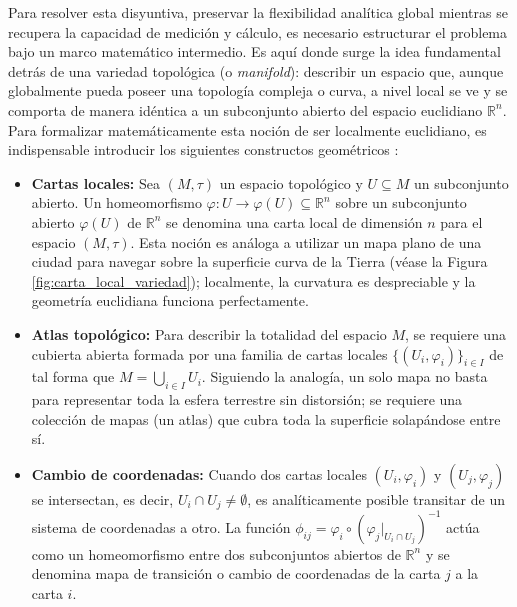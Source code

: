 Para resolver esta disyuntiva, preservar la flexibilidad analítica global mientras se recupera la capacidad de medición 
y cálculo, es necesario estructurar el problema bajo un marco matemático intermedio. Es aquí donde surge la idea 
fundamental detrás de una variedad topológica (o \textit{manifold}): describir un espacio que, aunque globalmente 
pueda poseer una topología compleja o curva, a nivel local se ve y se comporta de manera idéntica a un subconjunto 
abierto del espacio euclidiano $\mathbb{R}^n$. Para formalizar matemáticamente esta noción de ser localmente euclidiano, 
es indispensable introducir los siguientes constructos geométricos \parencite{waldmann2014topology}:

\begin{itemize}
    \item \textbf{Cartas locales:} Sea $(M, \tau)$ un espacio topológico 
    y $U \subseteq M$ un subconjunto abierto. Un homeomorfismo $\varphi: U \to \varphi(U) \subseteq \mathbb{R}^n$ 
    sobre un subconjunto abierto $\varphi(U)$ de $\mathbb{R}^n$ se 
    denomina una carta local de dimensión $n$ para el espacio $(M, \tau)$. 
    Esta noción es análoga a utilizar un mapa plano de una ciudad para navegar 
    sobre la superficie curva de la Tierra (véase la Figura \ref{fig:carta_local_variedad}); 
    localmente, la curvatura es despreciable 
    y la geometría euclidiana funciona perfectamente.
    
    \item \textbf{Atlas topológico:} Para describir la totalidad del espacio $M$, se 
    requiere una cubierta abierta formada por una familia de cartas locales $\{(U_i, \varphi_i)\}_{i \in I}$ 
    de tal forma que $M = \bigcup_{i \in I} U_i$.
    Siguiendo la analogía, un solo mapa no basta para representar toda la esfera 
    terrestre sin distorsión; se requiere una colección de mapas (un atlas) que 
    cubra toda la superficie solapándose entre sí.
    
    \item \textbf{Cambio de coordenadas:} Cuando dos cartas locales $(U_i, \varphi_i)$ y $(U_j, \varphi_j)$ 
    se intersectan, es decir, $U_i \cap U_j \neq \emptyset$, es analíticamente posible transitar 
    de un sistema de coordenadas a otro. La función $\phi_{ij} = \varphi_i \circ (\varphi_j|_{U_i \cap U_j})^{-1}$ 
    actúa como un homeomorfismo entre dos subconjuntos abiertos de $\mathbb{R}^n$ y se denomina mapa 
    de transición o cambio de coordenadas de la carta $j$ a la carta $i$.
\end{itemize}


